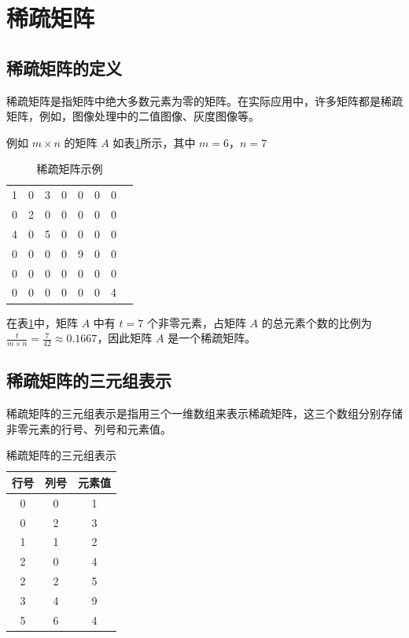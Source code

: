 \documentclass[lang=cn,newtx,10pt,scheme=chinese]{elegantbook}
\begin{document}
\section{稀疏矩阵}



\subsection{稀疏矩阵的定义}

稀疏矩阵是指矩阵中绝大多数元素为零的矩阵。在实际应用中，许多矩阵都是稀疏矩阵，例如，图像处理中的二值图像、灰度图像等。

例如 $m \times n$ 的矩阵 $A$ 如表\ref{table:sparse_matrix}所示，其中 $m = 6$，$n = 7$

\begin{table}[htbp]
  \centering
  \caption{稀疏矩阵示例}
  \begin{tabular}{||ccccccc||c}
    
    1 & 0 & 3 & 0 & 0 & 0 & 0 \\
    0 & 2 & 0 & 0 & 0 & 0 & 0 \\
    4 & 0 & 5 & 0 & 0 & 0 & 0 \\
    0 & 0 & 0 & 0 & 9 & 0 & 0 \\
    0 & 0 & 0 & 0 & 0 & 0 & 0 \\
    0 & 0 & 0 & 0 & 0 & 0 & 4 \\
    
  \end{tabular}
  \label{table:sparse_matrix}
\end{table}

在表\ref{table:sparse_matrix}中，矩阵 $A$ 中有 $t = 7$ 个非零元素，占矩阵 $A$ 的总元素个数的比例为 $\frac{t}{m \times n} = \frac{7}{42} \approx 0.1667$，因此矩阵 $A$ 是一个稀疏矩阵。

\subsection{稀疏矩阵的三元组表示}

稀疏矩阵的三元组表示是指用三个一维数组来表示稀疏矩阵，这三个数组分别存储非零元素的行号、列号和元素值。


\begin{table}[htbp]
  \centering
  \caption{稀疏矩阵的三元组表示}
  \begin{tabular}{|c|c|c|}
    \hline
    行号 & 列号 & 元素值 \\
    \hline
    0 & 0 & 1 \\
    0 & 2 & 3 \\
    1 & 1 & 2 \\
    2 & 0 & 4 \\
    2 & 2 & 5 \\
    3 & 4 & 9 \\
    5 & 6 & 4 \\
    \hline
  \end{tabular}
  \label{table:sparse_matrix_triplet}
\end{table}
\end{document}
